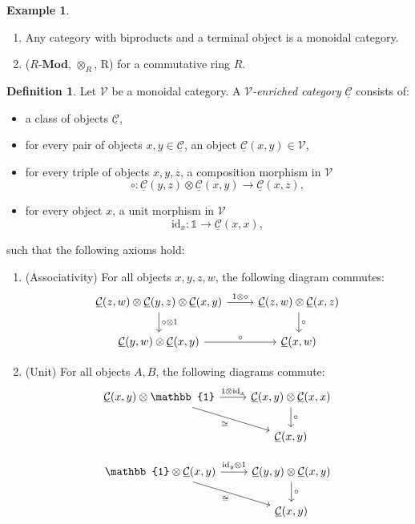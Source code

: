 \documentclass[11pt]{article}
\theoremstyle{definition}
\newtheorem{definition}[theorem]{Definition}
\newtheorem{example}[theorem]{Example}
\theoremstyle{remark}
\newcommand{\Mod}{\mathbf{Mod}}
\newcommand{\calC}{\mathcal{C}}
\newcommand{\ucalC}{\underline{\mathcal{C}}}
\newcommand{\calV}{\mathcal{V}}
\newcommand{\bbone}{\mathbb{1}}
\begin{document}
\begin{example}
    \begin{enumerate}
        \item Any category with biproducts and a terminal object is a monoidal category.
        \item ($R$-$\Mod$, $\otimes_R$, R) for a commutative ring $R$.
    \end{enumerate}
\end{example}

\begin{definition}
Let $\calV$ be a monoidal category.  
A \emph{$\mathcal{V}$-enriched category} $\underline{\calC}$ consists of:

\begin{itemize}
    \item a class of objects $\underline{\calC}$,
    \item for every pair of objects $x,y \in \underline{\calC}$, an object $\underline{\calC}(x,y) \in \mathcal{V}$,
    \item for every triple of objects $x,y,z$, a composition morphism in $\mathcal{V}$
    \[
    \circ : \underline{\calC}(y,z) \otimes \underline{\calC}(x,y)
    \to
    \underline{\calC}(x,z),
    \]
    \item for every object $x$, a unit morphism in $\mathcal{V}$
    \[
    \mathrm{id}_x : \bbone \to \underline{\calC}(x,x),
    \]
\end{itemize}

such that the following axioms hold:

\begin{enumerate}
    \item (Associativity) For all objects $x,y,z,w$, the following diagram commutes:
        \[
        \begin{tikzcd}
            \ucalC(z,w) \otimes \ucalC(y,z) \otimes \ucalC(x,y) \arrow[r, "1 \otimes \circ"]
                \arrow[d, "\circ \otimes 1"] & \ucalC(z,w) \otimes \ucalC(x,z) \arrow[d, "\circ"] \\
            \ucalC(y,w) \otimes \ucalC(x,y) \arrow [r, "\circ"] & \ucalC(x,w)
        \end{tikzcd}
        \]
    \item (Unit) For all objects $A,B$, the following diagrams commute:
        \[
        \begin{tikzcd}
            \ucalC(x,y) \otimes \bbone \arrow[r, "1 \otimes \mathrm{id}_x"] \arrow[dr, "\cong"']
                & \ucalC(x,y) \otimes \ucalC(x,x) \arrow[d,"\circ"] \\
            & \ucalC(x,y)
        \end{tikzcd}
        \]

        \[
        \begin{tikzcd}
            \bbone \otimes \ucalC(x,y) \arrow[r, "\mathrm{id}_y \otimes 1"] \arrow[dr, "\cong"']
                & \ucalC(y,y) \otimes \ucalC(x,y) \arrow[d,"\circ"] \\
            & \ucalC(x,y)
        \end{tikzcd}
        \]
\end{enumerate}
\end{definition}
\end{document}
